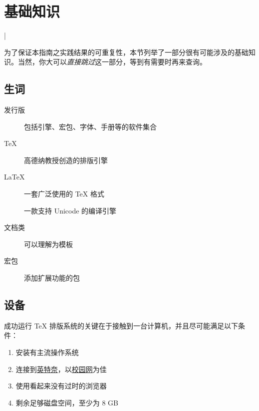 \section{基础知识}
\label{sec:intro}

\lstMakeShortInline[
  style=style@base,
  language=bash,
  columns=fixed]|

\begin{widepar}
为了保证本指南之实践结果的可重复性，本节列举了一部分很有可能涉及的基础知识。当然，你大可以\emph{直接跳过}这一部分，等到有需要时再来查询。
\end{widepar}

\subsection{生词}

\begin{description}
  \item[发行版] 包括引擎、宏包、字体、手册等的软件集合
  \item[\TeX{}] 高德纳教授创造的排版引擎
  \item[\LaTeX{}] 一套广泛使用的 \TeX{} 格式
  \item[] 一款支持 Unicode 的编译引擎
  \item[文档类] 可以理解为模板
  \item[宏包] 添加扩展功能的包
\end{description}

\subsection{设备}
\label{subsec:device}

成功运行 \TeX{} 排版系统的关键在于接触到一台计算机，并且尽可能满足以下条件：

\begin{enumerate}
  \item 安装有主流操作系统
  \item 连接到\href{https://www.bilibili.com/video/BV1vW411Y7oh}{英特奈}，以\href{https://p.nju.edu.cn}{校园网}为佳
  \item 使用看起来没有过时的浏览器
  \item 剩余足够磁盘空间，至少为 8 GB
\end{enumerate}


